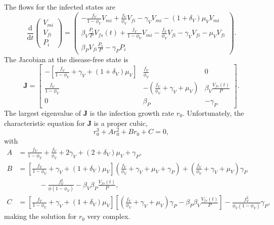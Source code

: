 \documentclass{article}
\newcommand{\md}{\mathrm{d}}
\newcommand{\mat}[1]{\mathbf{#1}}
\begin{document}
The flows for the infected states are
\begin{equation}
  \frac{\md}{\md t}
  \begin{pmatrix}
    V_{mi}
    \\
    V_{fi}
    \\
    P_i
  \end{pmatrix}
  =
  \begin{pmatrix}
    - \frac{f_V}{1 - \phi_V} V_{mi}
    + \frac{f_V}{\phi_V} V_{fi}
    - \gamma_V V_{mi}
    - (1 + \delta_V) \mu_V V_{mi}
    \\
    \beta_V \frac{P_i}{P} V_{fs}(t)
    + \frac{f_V}{1 - \phi_V} V_{mi}
    - \frac{f_V}{\phi_V} V_{fi}
    - \gamma_V V_{fi}
    - \mu_V V_{fi}
    \\
    \beta_P V_{fi} \frac{P_s}{P}
    - \gamma_P P_i
  \end{pmatrix}.
\end{equation}
The Jacobian at the disease-free state is
\begin{equation}
  \mat{J} =
  \begin{bmatrix}
    - \left[
      \frac{f_V}{1 - \phi_V}
      + \gamma_V + (1 + \delta_V) \mu_V
    \right]
    &
    \frac{f_V}{\phi_V}
    &
    0
    \\
    \frac{f_V}{1 - \phi_V}
    &
    - (\frac{f_V}{\phi_V} + \gamma_V + \mu_V)
    &
    \beta_V \frac{V_{fs}(t)}{P}
    \\
    0
    &
    \beta_P
    &
    - \gamma_P
  \end{bmatrix}.
\end{equation}
The largest eigenvalue of $\mat{J}$ is the infection growth rate
$r_0$.  Unfortunately, the characteristic equation for $\mat{J}$ is a
proper cubic,
\begin{equation}
  r_0^3 + A r_0^2 + B r_0 + C = 0,
\end{equation}
with
\begin{equation}
  \begin{split}
    A &= \frac{f_V}{1 - \phi_V} + \frac{f_V}{\phi_V} + 2 \gamma_V + (2 + \delta_V) \mu_V
    + \gamma_P,
    \\
    B &= \left[
      \frac{f_V}{1 - \phi_V} + \gamma_V + (1 + \delta_V) \mu_V
    \right]
    \left(\frac{f_V}{\phi_V} + \gamma_V + \mu_V + \gamma_P\right)
    + \left(\frac{f_V}{\phi_V} + \gamma_V + \mu_V\right) \gamma_P
    \\ & \quad\quad\quad {}
    - \frac{f_V^2}{\phi (1 - \phi_V)}
    - \beta_V \beta_P \frac{V_{fs}(t)}{P},
    \\
    C &= \left[
      \frac{f_V}{1 - \phi_V} + \gamma_V + (1 + \delta_V) \mu_V
    \right]
    \left[
      \left(\frac{f_V}{\phi_V} + \gamma_V + \mu_V\right) \gamma_P
      - \beta_P \beta_V \frac{V_{fs}(t)}{P}
    \right]
    - \frac{f_V^2}{\phi_V (1 - \phi_V)} \gamma_P,
  \end{split}
\end{equation}
making the solution for $r_0$ very complex.
\end{document}
